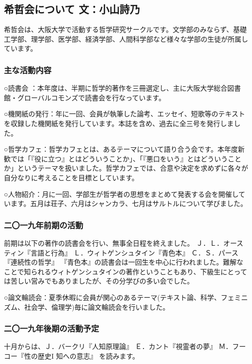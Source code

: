 \documentclass[b5j,twoside,twocolumn]{utarticle}
\begin{document}
\setlength{\footskip}{-2mm}
\chead[]{}
\rhead[]{}
\lfoot[]{\thepage{}}
\cfoot[]{}
\rfoot[\thepage{}]{}
\thispagestyle{fancy}

\subsection*{希哲会について \small 文：小山詩乃}
\indent
希哲会は、大阪大学で活動する哲学研究サークルです。文学部のみならず、基礎工学部、理学部、医学部、経済学部、人間科学部など様々な学部の生徒が所属しています。
\vspace{-2zw}
\subsubsection*{主な活動内容}
\vspace{-1zw}
○読書会 ：本年度は、半期に哲学的著作を三冊選定し、主に大阪大学総合図書館・グローバルコモンズで読書会を行なっています。


○機関紙の発行：年に一回、会員が執筆した論考、エッセイ、短歌等のテキストを収録した機関紙を発行しています。本誌を含め、過去に全三号を発行しました。


○哲学カフェ：哲学カフェとは、あるテーマについて語り合う会です。本年度新歓では「『役に立つ』とはどういうことか」、「『悪口をいう』とはどういうことか」というテーマを扱いました。哲学カフェでは、合意や決定を求めずに各々が自分なりに考えることを目標としています。


○人物紹介：月に一回、学部生が哲学者の思想をまとめて発表する会を開催しています。五月は荘子、六月はシャンカラ、七月はサルトルについて学びました。
\vspace{-2zw}
\subsubsection*{二〇一九年前期の活動}
\vspace{-1zw}
前期は以下の著作の読書会を行い、無事全日程を終えました。
Ｊ．Ｌ．オースティン『言語と行為』
Ｌ．ウィトゲンシュタイン『青色本』
Ｃ．Ｓ．パース『連続性の哲学』
『青色本』の読書会は一回生を中心に行われました。難解なことで知られるウィトゲンシュタインの著作ということもあり、下級生にとっては苦しい営みでもありましたが、その分学びの多い会でした。

○論文輪読会：夏季休暇に会員が関心のあるテーマ(テキスト論、科学、フェミニズム、社会学、倫理学)毎に論文輪読会を行いました。

\vspace{-2zw}
\subsubsection*{二〇一九年後期の活動予定}
\vspace{-1zw}
十月からは、Ｊ．バークリ『人知原理論』
Ｅ．カント『視霊者の夢』
Ｍ．フーコー『性の歴史I 知への意志』
を読みます。
\end{document}
